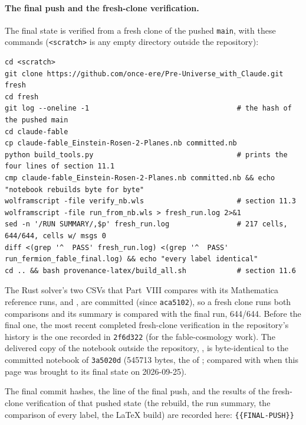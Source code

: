 \paragraph{The final push and the fresh-clone verification.} The final state is verified from a fresh
clone of the pushed \texttt{main}, with these commands (\texttt{<scratch>} is any empty directory
outside the repository):

\begin{Verbatim}
cd <scratch>
git clone https://github.com/once-ere/Pre-Universe_with_Claude.git fresh
cd fresh
git log --oneline -1                                   # the hash of the pushed main
cd claude-fable
cp claude-fable_Einstein-Rosen-2-Planes.nb committed.nb
python build_tools.py                                  # prints the four lines of section 11.1
cmp claude-fable_Einstein-Rosen-2-Planes.nb committed.nb && echo "notebook rebuilds byte for byte"
wolframscript -file verify_nb.wls                      # section 11.3
wolframscript -file run_from_nb.wls > fresh_run.log 2>&1
sed -n '/RUN SUMMARY/,$p' fresh_run.log                # 217 cells, 644/644, cells w/ msgs 0
diff <(grep '^  PASS' fresh_run.log) <(grep '^  PASS' run_fermion_fable_final.log) && echo "every label identical"
cd .. && bash provenance-latex/build_all.sh            # section 11.6
\end{Verbatim}

The Rust solver's two CSVs that Part~VIII compares with its Mathematica reference runs,
 and , are
committed (since \texttt{aca5102}), so a fresh clone runs both comparisons and its summary is compared
with the final run, 644/644. Before the final one, the most recent completed fresh-clone verification
in the repository's history is the one recorded in \texttt{2f6d322} (for the fable-cosmology work).
The delivered copy of the notebook outside the repository,
, is byte-identical to the
committed notebook of \texttt{3a5020d} (545713 bytes, the  of ;
compared with  when this page was brought to its final state on 2026-09-25).

The final commit hashes, the  line of the final push, and the results of the
fresh-clone verification of that pushed state (the rebuild, the run summary, the comparison of every
label, the LaTeX build) are recorded here: \texttt{\{\{FINAL-PUSH\}\}}


